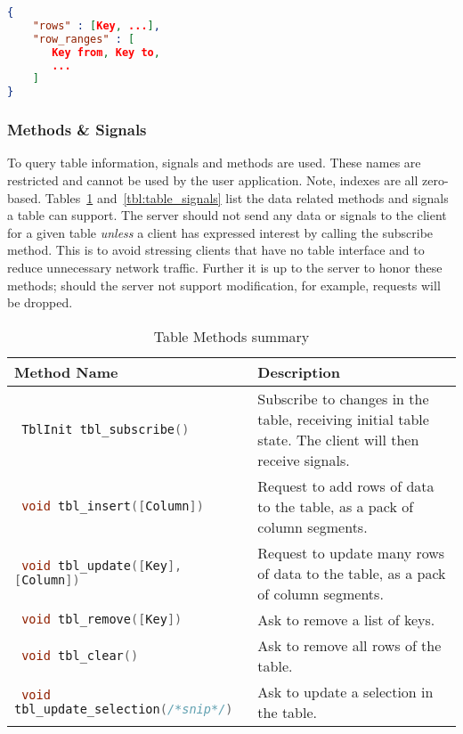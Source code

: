 \documentclass[11pt, oneside]{amsart}
\begin{document}
\begin{lstlisting}[language=json, label=listing:selection_object, caption=Selection object definition. Note that the \texttt{to} field in the row ranges is exclusive. The \texttt{row\_ranges} list \textit{must} have an even number of elements. ]
{
	"rows" : [Key, ...],
	"row_ranges" : [
	   Key from, Key to,
	   ...
	]
}
\end{lstlisting}

\subsubsection{Methods \& Signals}

To query table information, signals and methods are used. These names are restricted and cannot be used by the user application. Note, indexes are all zero-based. Tables~\ref{tbl:table_methods} and~\ref{tbl:table_signals} list the data related methods and signals a table can support. The server should not send any data or signals to the client for a given table \emph{unless} a client has expressed interest by calling the subscribe method. This is to avoid stressing clients that have no table interface and to reduce unnecessary network traffic. Further it is up to the server to honor these methods; should the server not support modification, for example, requests will be dropped.

\begin{table}
	\begin{tabularx}{.9\textwidth}{p{2.5in}X}
		\toprule
		Method Name & Description \\
		\midrule
		\lstinline[language=c++]| TblInit tbl_subscribe() |
		&
		Subscribe to changes in the table, receiving initial table state. The client will then receive signals.
		\\
		\lstinline[language=c++]| void tbl_insert([Column]) |
		&
		Request to add rows of data to the table, as a pack of column segments.
		\\
        \lstinline[language=c++]| void tbl_update([Key], [Column]) |
        &
        Request to update many rows of data to the table, as a pack of column segments.
        \\
		\lstinline[language=c++]| void tbl_remove([Key]) |
		&
		Ask to remove a list of keys.
		\\
		\lstinline[language=c++]| void tbl_clear() |
		&
		Ask to remove all rows of the table.
		\\
		\lstinline[language=c++]| void tbl_update_selection(/*snip*/) |
		&
		Ask to update a selection in the table.
		\\
		\bottomrule
	\end{tabularx}
	\caption{Table Methods summary}
	\label{tbl:table_methods}
\end{table}
\end{document}
